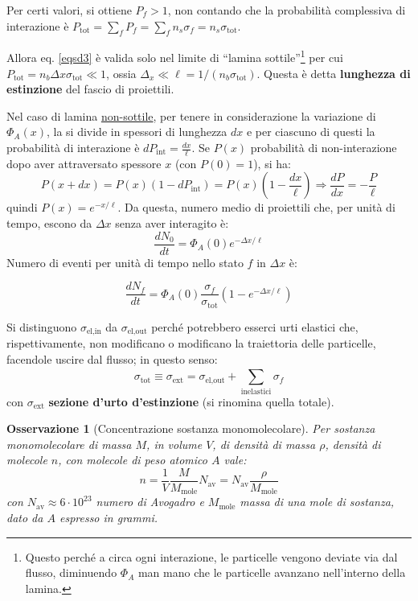 \documentclass[10pt, a4paper]{scrartcl}
\numberwithin{equation}{subsection}
\theoremstyle{style1}
\newtheorem{osservazione}{Osservazione}[section]
\newenvironment{boxenv}[1][]{
    \begin{eqbox}[#1]
    }{
   \end{eqbox}
}
\begin{document}
Per certi valori, si ottiene $P_f>1$, non contando che la probabilit\`a complessiva di interazione \`e $P_\text{tot}= \sum_f P_f = \sum_f n_s \sigma _f = n_s \sigma _\text{tot}$. 

Allora eq. \ref{eqsd3} \`e valida solo nel limite di ``lamina sottile''\footnote{Questo perch\'e a circa ogni interazione, le particelle vengono deviate via dal flusso, diminuendo $\Phi_A$ man mano che le particelle avanzano nell'interno della lamina.} per cui $P_\text{tot}=n_b\Delta x \sigma _\text{tot}\ll 1$, ossia $\Delta _x \ll \ell  = 1/(n_b \sigma _\text{tot})$. Questa \`e detta \textbf{lunghezza di estinzione} del fascio di proiettili.

Nel caso di lamina \underline{non-sottile}, per tenere in considerazione la variazione di $\Phi_A(x)$, la si divide in spessori di lunghezza $dx$ e per ciascuno di questi la probabilit\`a di interazione \`e $dP_\text{int} = \frac{dx}{\ell }$. Se $P(x)$ probabilit\`a di non-interazione dopo aver attraversato spessore $x$ (con $P(0) = 1$), si ha:
\begin{equation}
	P(x+dx) = P(x) (1-dP_\text{int}) = P(x) \left(1- \frac{dx}{\ell }\right) \Rightarrow \frac{d P}{d x} = - \frac{P}{\ell }
\end{equation}
quindi $P(x) = e^{- x / \ell } $. Da questa, numero medio di proiettili che, per unit\`a di tempo, escono da $\Delta x$ senza aver interagito \`e:
\begin{equation}
	\frac{d N_0}{d t}  = \Phi_A(0) e^{- \Delta x / \ell } 
\end{equation}
Numero di eventi per unit\`a di tempo nello stato $f$ in $\Delta x$ \`e:
\begin{boxenv}[]
\begin{equation}
	\frac{d N_f}{d t} = \Phi_A(0) \frac{\sigma _f}{\sigma _\text{tot}} (1- e^{- \Delta x / \ell } )
\end{equation}
\end{boxenv}
\noindent Si distinguono $\sigma _\text{el,in}$ da $\sigma _\text{el,out}$ perch\'e potrebbero esserci urti elastici che, rispettivamente, non modificano o modificano la traiettoria delle particelle, facendole uscire dal flusso; in questo senso:
\begin{equation}
	\sigma _\text{tot} \equiv \sigma _\text{ext} = \sigma _\text{el,out}+ \sum_{\text{inelastici}}^{} \sigma _f
\end{equation}
con $\sigma _\text{ext}$ \textbf{sezione d'urto d'estinzione} (si rinomina quella totale).
\begin{osservazione}
	[Concentrazione sostanza monomolecolare]
	Per sostanza monomolecolare di massa $M$, in volume $V$, di densit\`a di massa $\rho $, densit\`a di molecole $n$, con molecole di peso atomico $A$ vale:
	\begin{equation}
		n = \frac{1}{V}\frac{M}{M_\text{mole}} N_\text{av} =N_\text{av} \frac{\rho }{M_\text{mole}}
	\end{equation}
con $N_\text{av}\approx 6 \cdot 10^{23} $ numero di Avogadro e $M_\text{mole}$ massa di una mole di sostanza, dato da $A$ espresso in grammi.
\end{osservazione}
\end{document}
